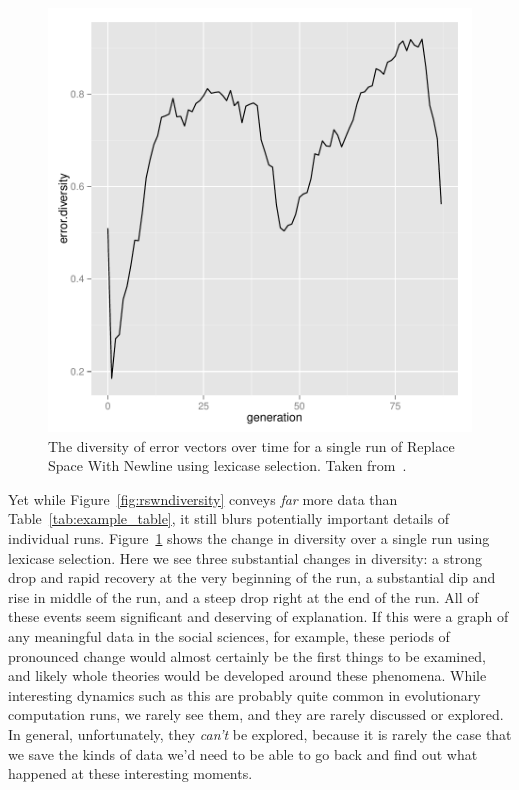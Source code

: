 \begin{figure}
	\includegraphics[width=0.7\linewidth]{Figures/run6_lexicase_rswn_diversity}
	\caption{The diversity of error vectors over time for a single run of
	Replace Space With Newline using lexicase selection. Taken from~\cite{diversity_gecco}.}
	\label{fig:run6lexicaserswndiversity}
\end{figure}

Yet while Figure~\ref{fig:rswndiversity} conveys \emph{far} more data
than Table~\ref{tab:example_table}, it still blurs potentially important
details of individual runs. Figure~\ref{fig:run6lexicaserswndiversity} shows
the change in diversity over a single run using lexicase selection. Here we 
see three substantial changes in diversity: a strong drop and rapid recovery
at the very beginning of the run, a substantial dip and rise in middle of the run, and a steep drop right at the end of the run. All of these events seem
significant and deserving of explanation. If this were a graph of any meaningful data in the social sciences, for example, these periods of
pronounced change would almost certainly be the first things to be
examined, and likely whole theories would be developed around these
phenomena. While interesting dynamics such as this are probably quite
common in evolutionary computation runs, we rarely see them, and they
are rarely discussed or explored. In general, unfortunately, they
\emph{can't} be explored, because it is rarely the case that we save the
kinds of data we'd need to be able to go back and find out what happened
at these interesting moments.

